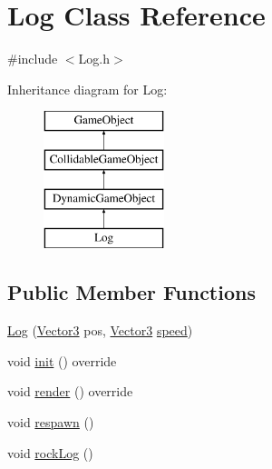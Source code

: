 \hypertarget{class_log}{}\section{Log Class Reference}
\label{class_log}


{\ttfamily \#include $<$Log.\+h$>$}

Inheritance diagram for Log\+:\begin{figure}[H]
\begin{center}
\leavevmode
\includegraphics[height=4.000000cm]{class_log}
\end{center}
\end{figure}
\subsection*{Public Member Functions}
\begin{DoxyCompactItemize}
\item 
\hyperlink{class_log_aab0f1ee2fbfa2962846e0c84b032a11f}{Log} (\hyperlink{class_vector3}{Vector3} pos, \hyperlink{class_vector3}{Vector3} \hyperlink{class_dynamic_game_object_a54cb8a3a5fe8314cd5751f223b2b49ae}{speed})
\item 
void \hyperlink{class_log_aa6d8efc1a2ca7c84945bd129fe92448f}{init} () override
\item 
void \hyperlink{class_log_a150966688120bfd2e4f29f57bbb65031}{render} () override
\item 
void \hyperlink{class_log_a8f4f588a53320811a95a703fb1a9de8f}{respawn} ()
\item 
void \hyperlink{class_log_ae11177063e932d7895f09e826c685144}{rock\+Log} ()
\end{DoxyCompactItemize}
